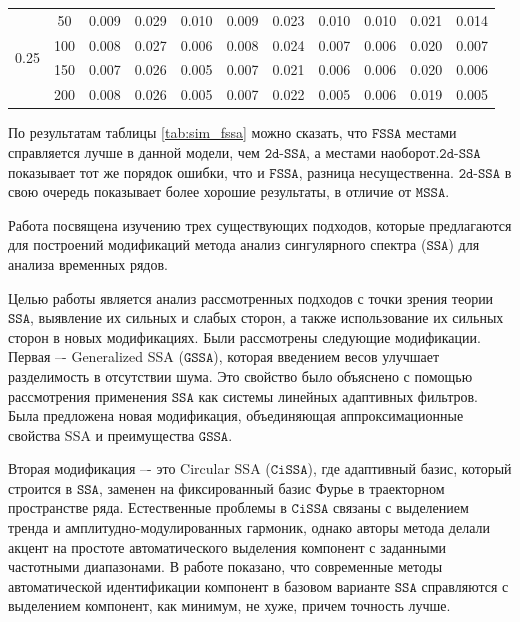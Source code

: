 \documentclass[12pt, specialist, subf
]{disser}
\theoremstyle{definition}
\newcommand{\SSA}{\texttt{SSA}}
\newcommand{\GSSA}{\texttt{GSSA}}
\newcommand{\CISSA}{\texttt{CiSSA}}
\newcommand{\MSSA}{\texttt{MSSA}}
\newcommand{\FSSA}{\texttt{FSSA}}
\newcommand{\DSSA}{\texttt{2d-SSA}}
\begin{document}
\begin{table}[H]
\begin{tabular}{c|c|ccc|ccc|ccc}
		\midrule
		\multirow{4}{*}{0.25}         & 50                       & 0.009                       & 0.029                       & 0.010                      & 0.009  & 0.023 & 0.010 & 0.010  & 0.021 & 0.014 \\
		                              & 100                      & 0.008                       & 0.027                       & 0.006                      & 0.008  & 0.024 & 0.007 & 0.006  & 0.020 & 0.007 \\
		                              & 150                      & 0.007                       & 0.026                       & 0.005                      & 0.007  & 0.021 & 0.006 & 0.006  & 0.020 & 0.006 \\
		                              & 200                      & 0.008                       & 0.026                       & 0.005                      & 0.007  & 0.022 & 0.005 & 0.006  & 0.019 & 0.005 \\
		\bottomrule
	\end{tabular}
\end{table}


По результатам таблицы \ref{tab:sim_fssa} можно сказать, что $\FSSA$ местами справляется лучше в данной модели, чем $\DSSA$, а местами наоборот.$\DSSA$ показывает тот же порядок ошибки, что и $\FSSA$, разница несущественна. $\DSSA$ в свою очередь показывает более хорошие результаты, в отличие от $\MSSA$.


\newpage



\conclusion
\label{sec:concl}


Работа посвящена изучению трех существующих подходов, которые предлагаются для построений модификаций метода анализ сингулярного спектра ($\SSA$) для анализа временных рядов. 

Целью работы является анализ рассмотренных подходов с точки зрения теории $\SSA$, выявление их сильных и слабых сторон, а также использование их сильных сторон в новых модификациях. Были рассмотрены следующие модификации. Первая –- Generalized SSA ($\GSSA$), которая введением весов улучшает разделимость в отсутствии шума. Это свойство было объяснено с помощью рассмотрения применения $\SSA$ как системы линейных адаптивных фильтров. Была предложена новая модификация, объединяющая аппроксимационные свойства SSA и преимущества $\GSSA$. 

Вторая модификация –- это Circular SSA ($\CISSA$), где адаптивный базис, который строится в $\SSA$, заменен на фиксированный базис Фурье в траекторном пространстве ряда. Естественные проблемы в $\CISSA$ связаны с выделением тренда и амплитудно-модулированных гармоник, однако авторы метода делали акцент на простоте автоматического выделения компонент с заданными частотными диапазонами. В работе показано, что современные методы автоматической идентификации компонент в базовом варианте $\SSA$ справляются с выделением компонент, как минимум, не хуже, причем точность лучше. 
\end{document}
